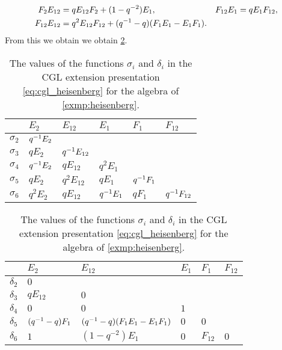 \begin{example}
\begin{align*}
		F_2 E_{12}   & = q E_{12}F_2 + (1 -q^{-2})E_1,                        &  & F_{12}E_1 = q E_1 F_{12},                   \\
		F_{12}E_{12} & = q^2 E_{12} F_{12} + (q^{-1} - q) (F_1 E_1 - E_1 F_1).
	\end{align*}
	From this we obtain we obtain \cref{table:sigma_delta_heisenberg}.
	\begin{table}
		\begin{center}
		\begin{tabular}{c|lllll}
			           & $E_2$   & $E_{12}$ & $E_{1}$ & $F_1$   & $F_{12}$ \\
			\hline
			$\sigma_2$ & $q^{-1} E_2$                                           \\
			$\sigma_3$ & $q E_2$     & $q^{-1} E_{12}$                                 \\
			$\sigma_4$ & $q^{-1} E_2$ & $q E_{12}$      & $q^2 E_1$                        \\
			$\sigma_5$ & $q E_2$     & $q^2 E_{12}$    & $q E_1$     & $q^{-1} F_1$            \\
			$\sigma_6$ & $q^2 E_2$   & $q E_{12}$      & $q^{-1} E_1$ & $q F_1$     & $q^{-1} F_{12}$
		\end{tabular}
		\begin{tabular}{c|lllll}
			           & $E_2$           & $E_{12}$                        & $E_{1}$ & $F_1$    & $F_{12}$ \\
			\hline
			$\delta_2$ & $0$                                                                               \\
			$\delta_3$ & $q E_{12}$      & $0$                                                             \\
			$\delta_4$ & $0$             & $0$                             & $1$                           \\
			$\delta_5$ & $(q^{-1} -q)F_1$ & $(q^{-1} -q)(F_1 E_1 - E_1 F_1)$ & $0$     & $0$                 \\
			$\delta_6$ & $1$             & $(1- q^{-2})E_1$                & $0$     & $F_{12}$ & $0$
		\end{tabular}
		\end{center}
		\caption{The values of the functions $\sigma_i$ and $\delta_i$ in the CGL extension presentation \cref{eq:cgl_heisenberg} for the algebra of \cref{exmp:heisenberg}. }
		\label{table:sigma_delta_heisenberg}
	\end{table}


\end{example}

